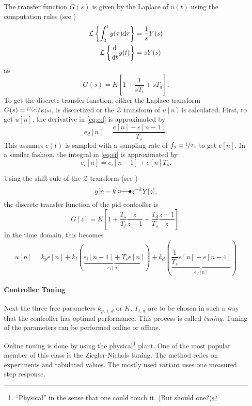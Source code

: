 The transfer function $G(s)$ is given by the Laplace of $u(t)$ using the computation rules (see \cite{Leon2015})
\begin{align}
\mathcal{L}\left\{\int_{0}^{t} y(\tau) \text{d}{\tau}\right\} &= \frac{1}{s} Y(s)\\
\mathcal{L}\left\{\frac{\text{d}{}}{\text{d}{t}} y(t)\right\} &= s Y(s)
\end{align}
as
\begin{equation}
G(s)=K\left[1+\frac{1}{s T_i}+s T_d\right].
\end{equation}
To get the discrete transfer function, either the Laplace transform $G(s)=\nicefrac{U(s)}{E(s)}$, is discretized or the $\mathcal{Z}$ transform of $u[n]$ is calculated.
First, to get $u[n]$, the derivative in \autoref{eq:ed} is approximated by
\begin{equation}
e_d[n]=\frac{e[n]-e[n-1]}{T_s}.
\end{equation}
This assumes $e(t)$ is sampled with a sampling rate of $f_s=\nicefrac{1}{T_s}$ to get $e[n]$. In a similar fashion, the integral in \autoref{eq:ei} is approximated by
\begin{equation}
e_i[n]=e_i[n-1] + e[n] T_s.
\end{equation}

Using the shift rule of the $\mathcal{Z}$ transform (see \cite{Leon2015})
\begin{equation}
y[n-k] \laplace z^{-k} Y[z],
\end{equation}
the discrete transfer function of the \gls{pid} controller is
\begin{equation}
G[z]=K\left[1+\frac{T_s}{T_i}\frac{z}{z-1}+\frac{T_d}{T_s}\frac{z-1}{z}\right].
\end{equation}
In the time domain, this becomes
\begin{equation}\label{eq:pidn}
u[n] = k_p e[n] 
+ k_i \left(\underbrace{e_i[n-1] + T_s e[n]}_{e_i[n]}\right) 
+ k_d \left(\underbrace{\frac{1}{T_s} e[n]-e[n-1]}_{e_d[n]}\right)
\end{equation}

\paragraph{Controller Tuning}
Next the three free parameters $k_{p,\,i,\,d}$ or $K,\,T_{i,\,d}$ are to be chosen in such a way that the controller has optimal performance. This process is called \textit{tuning}. Tuning of the parameters can be performed online or offline.

Online tuning is done by using the physical\footnote{``Physical'' in the sense that one could touch it. (But should one?)} plant. One of the most popular member of this class is the Ziegler-Nichols tuning. The method relies on experiments and tabulated values. The mostly used variant uses one measured step response. \cite{Ziegler1942}


